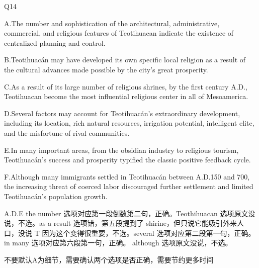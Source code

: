 \begin{blk}
    \begin{qst}
        Q14
    \end{qst}

    \begin{chc}
        A.The number and sophistication of the architectural, administrative, commercial, and religious features of Teotihuacan indicate the existence of centralized planning and control.

        B.Teotihuacán may have developed its own specific local religion as a result of the cultural advances made possible by the city’s great prosperity.

        C.As a result of its large number of religious shrines, by the first century A.D., Teotihuacan become the most influential religious center in all of Mesoamerica.

        D.Several factors may account for Teotihuacán’s extraordinary development, including its location, rich natural resources, irrigation potential, intelligent elite, and the misfortune of rival communities.

        E.In many important areas, from the obsidian industry to religious tourism, Teotihuacán’s success and prosperity typified the classic positive feedback cycle.

        F.Although many immigrants settled in Teotihuacán between A.D.150 and 700, the increasing threat of coerced labor discouraged further settlement and limited Teotihuacán’s population growth.
    \end{chc}

    \begin{nlz}
        A.D.E the number 选项对应第一段倒数第二句，正确。Teothihuacan 选项原文没说，不选。as a result 选项错，第五段提到了 shirine，但只说它能吸引外来人口，没说 T 因为这个变得很重要，不选。several 选项对应第二段第一句，正确。in many 选项对应第六段第一句，正确。 although 选项原文没说，不选。

        不要默认A为细节，需要确认两个选项是否正确，需要节约更多时间
    \end{nlz}
\end{blk}